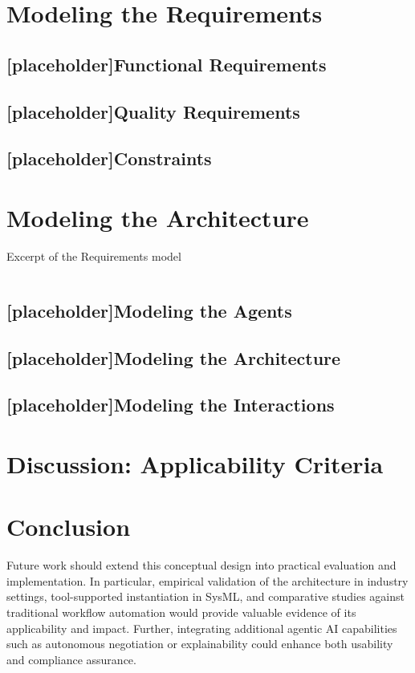 \section{Modeling the Requirements}\label{sec:mod-req}
\subsection{[placeholder]Functional Requirements}\label{subse:func-req}
\subsection{[placeholder]Quality Requirements}\label{subse:qua-req}
\subsection{[placeholder]Constraints}\label{subse:const}

\section{Modeling the Architecture}\label{sec:mod-mas}
\begin{listing}[h]
    \caption{Excerpt of the Requirements model}
    \inputminted[firstline=1,lastline=25]{text}{ressources/models/requirements.sysml}
\end{listing}
\subsection{[placeholder]Modeling the Agents}\label{subse:mod-agents}
\subsection{[placeholder]Modeling the Architecture}\label{subse:mod-arch}
\subsection{[placeholder]Modeling the Interactions}\label{subse:mod-interactions}

\section{Discussion: Applicability Criteria}\label{sec:app-criteria}
    
\section{Conclusion}
Future work should extend this conceptual design into practical evaluation and implementation. In particular, empirical validation of the architecture in industry settings, tool-supported instantiation in SysML, and comparative studies against traditional workflow automation would provide valuable evidence of its applicability and impact. Further, integrating additional agentic AI capabilities such as autonomous negotiation or explainability could enhance both usability and compliance assurance.
\clearpage